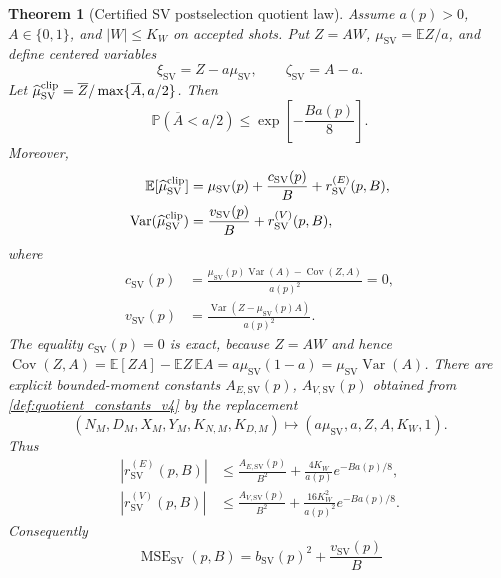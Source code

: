 \documentclass[11pt]{article}
\newtheorem{theorem}{Theorem}
\newcommand{\MSE}{\operatorname{MSE}}
\newcommand{\Var}{\operatorname{Var}}
\newcommand{\Cov}{\operatorname{Cov}}
\newcommand{\E}{\mathbb{E}}
\newcommand{\Prob}{\mathbb{P}}
\newcommand{\1}{\mathbf{1}}
\newcommand{\abs}[1]{\left\lvert #1 \right\rvert}
\begin{document}
\begin{theorem}[Certified SV postselection quotient law]
\label{thm:sv_quotient_law_v2}
Assume \(a(p)>0\), \(A\in\{0,1\}\), and \(\abs{W}\le K_W\) on accepted shots.  Put \(Z=AW\), \(\mu_{\mathrm{SV}}=\E Z/a\), and define centered variables
\begin{equation}
    \xi_{\mathrm{SV}}=Z-a\mu_{\mathrm{SV}},
    \qquad
    \zeta_{\mathrm{SV}}=A-a.
\end{equation}
Let \(\widehat\mu_{\mathrm{SV}}^{\rm clip}=\overline Z/\max\{\overline A,a/2\}\).  Then
\begin{equation}
    \Prob\left(\overline A<a/2\right)
    \le \exp\left[-\frac{B a(p)}{8}\right].
    \label{eq:sv_acceptance_bernstein_v5}
\end{equation}
Moreover,
\begin{align}
    \E[\widehat\mu_{\mathrm{SV}}^{\rm clip}]
    &=\mu_{\mathrm{SV}}(p)+\frac{c_{\mathrm{SV}}(p)}{B}+r^{(E)}_{\mathrm{SV}}(p,B),\\
    \Var(\widehat\mu_{\mathrm{SV}}^{\rm clip})
    &=\frac{v_{\mathrm{SV}}(p)}{B}+r^{(V)}_{\mathrm{SV}}(p,B),
\end{align}
where
\begin{align}
    c_{\mathrm{SV}}(p)
    &=\frac{\mu_{\mathrm{SV}}(p)\Var(A)-\Cov(Z,A)}{a(p)^2}=0,
    \label{eq:sv_quotient_bias_zero_v14}\\
    v_{\mathrm{SV}}(p)
    &=\frac{\Var(Z-\mu_{\mathrm{SV}}(p)A)}{a(p)^2}.
\end{align}
The equality \(c_{\mathrm{SV}}(p)=0\) is exact, because \(Z=AW\) and hence
\(\Cov(Z,A)=\E[ZA]-\E Z\,\E A=a\mu_{\mathrm{SV}}(1-a)=\mu_{\mathrm{SV}}\Var(A)\).
There are explicit bounded-moment constants \(A_{E,\mathrm{SV}}(p)\), \(A_{V,\mathrm{SV}}(p)\) obtained from \cref{def:quotient_constants_v4} by the replacement
\begin{equation}
    (N_M,D_M,X_M,Y_M,K_{N,M},K_{D,M})
    \mapsto
    (a\mu_{\mathrm{SV}},a,Z,A,K_W,1).
\end{equation}
Thus
\begin{align}
    \abs{r^{(E)}_{\mathrm{SV}}(p,B)}
    &\le \frac{A_{E,\mathrm{SV}}(p)}{B^2}+\frac{4K_W}{a(p)}e^{-Ba(p)/8},\\
    \abs{r^{(V)}_{\mathrm{SV}}(p,B)}
    &\le \frac{A_{V,\mathrm{SV}}(p)}{B^2}+\frac{16K_W^2}{a(p)^2}e^{-Ba(p)/8}.
\end{align}
Consequently
\begin{equation}
    \MSE_{\mathrm{SV}}(p,B)
    =b_{\mathrm{SV}}(p)^2+
    \frac{v_{\mathrm{SV}}(p)}{B}

\end{equation}
\end{theorem}
\end{document}
